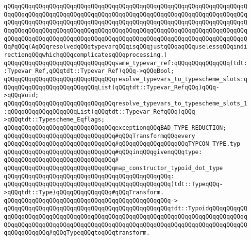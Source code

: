 \verb|qQQqqQQqqQQqqQQqqQQqqQQqqQQqqQQqqQQqqQQqqQQqqQQqqQQqqQQqqQQqqQQqqQQqqQQqqQQqqQQqqQQqqQQqqQQqqQQqqQQqqQQqqQQqqQQqqQQqqQQqqQQqqQQqqQQqqQQqqQQqqQQqqQQqqQQqqQQqqQQqqQQqqQQqqQQqqQQqqQQqqQQqqQQqqQQqqQQqqQQqqQQqqQQqqQQqqQQqqQQqqQQqqQQqqQQqqQQqqQQqqQQqqQQqqQQqqQQqqQQqqQQqqQQqqQQqqQQqqQQqqQQqqQQqqQQqqQQqqQQqqQQqqQQqqQQqqQQqqQQqqQQqqQQqqQQqqQQqqQQqqQQqqQQqqQQq#qQQq(AqQQqresolvedqQQqtypevarqQQqisqQQqjustqQQqaqQQquselessqQQqindirectionqQQqwhichqQQqcomplicatesqQQqprocessing.)|\newline
\newline
\verb|qQQqqQQqqQQqqQQqqQQqqQQqqQQqqQQqsame_typevar_ref:qQQqqQQqqQQqqQQq(tdt::Typevar_Ref,qQQqtdt::Typevar_Ref)qQQq->qQQqBool;|\newline
\newline
\verb|qQQqqQQqqQQqqQQqqQQqqQQqqQQqqQQqresolve_typevars_to_typescheme_slots:qQQqqQQqqQQqqQQqqQQqqQQqqQQqList(qQQqtdt::Typevar_RefqQQq)qQQq->qQQqVoid;|\newline
\verb|qQQqqQQqqQQqqQQqqQQqqQQqqQQqqQQqresolve_typevars_to_typescheme_slots_1:qQQqqQQqqQQqqQQqqQQqList(qQQqtdt::Typevar_RefqQQq)qQQq->qQQqtdt::Typescheme_Eqflags;|\newline
\newline
\verb|qQQqqQQqqQQqqQQqqQQqqQQqqQQqqQQqexceptionqQQqBAD_TYPE_REDUCTION;|\newline
\newline
\verb|qQQqqQQqqQQqqQQqqQQqqQQqqQQqqQQq#qQQqTransformqQQqevery|\newline
\verb|qQQqqQQqqQQqqQQqqQQqqQQqqQQqqQQq#qQQqqQQqqQQqqQQqqQQqTYPCON_TYPE.typ|\newline
\verb|qQQqqQQqqQQqqQQqqQQqqQQqqQQqqQQq#qQQqinqQQqgivenqQQqtype:|\newline
\verb|qQQqqQQqqQQqqQQqqQQqqQQqqQQqqQQq#|\newline
\verb|qQQqqQQqqQQqqQQqqQQqqQQqqQQqqQQqmap_constructor_typoid_dot_type|\newline
\verb|qQQqqQQqqQQqqQQqqQQqqQQqqQQqqQQqqQQqqQQqqQQqqQQq:|\newline
\verb|qQQqqQQqqQQqqQQqqQQqqQQqqQQqqQQqqQQqqQQqqQQqqQQq(tdt::TypeqQQq->qQQqtdt::Type)qQQqqQQqqQQqqQQq#qQQqTransform.|\newline
\verb|qQQqqQQqqQQqqQQqqQQqqQQqqQQqqQQqqQQqqQQqqQQqqQQq->|\newline
\verb|qQQqqQQqqQQqqQQqqQQqqQQqqQQqqQQqqQQqqQQqqQQqqQQqtdt::TypoidqQQqqQQqqQQqqQQqqQQqqQQqqQQqqQQqqQQqqQQqqQQqqQQqqQQqqQQqqQQqqQQqqQQqqQQqqQQqqQQqqQQqqQQqqQQqqQQqqQQqqQQqqQQqqQQqqQQqqQQqqQQqqQQqqQQqqQQqqQQqqQQqqQQqqQQqqQQqqQQqqQQq#qQQqTypeqQQqtoqQQqtransform.|\newline
